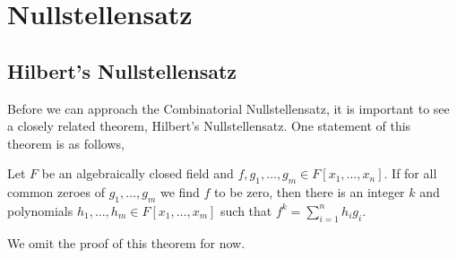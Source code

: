 \chapter{Nullstellensatz}
\section*{Hilbert's Nullstellensatz}
Before we can approach the Combinatorial Nullstellensatz, it is important to see a closely related theorem, Hilbert's Nullstellensatz. One statement of this theorem is as follows,
\begin{theorem}
 Let \(F\) be an algebraically closed field and \(f, g_1, \ldots, g_{m} \in F\left[ x_1, \ldots, x_{n} \right] \). If for all common zeroes of \(g_1, \ldots, g_{m}\) we find \(f\) to be zero, then there is an integer \(k\) and polynomials \(h_1, \ldots, h_{m} \in F\left[ x_1, \ldots, x_{m} \right] \)  such that \(f^{k} = \sum_{i= 1}^{n} h_{i}g_{i}\).
\end{theorem}
We omit the proof of this theorem for now.
